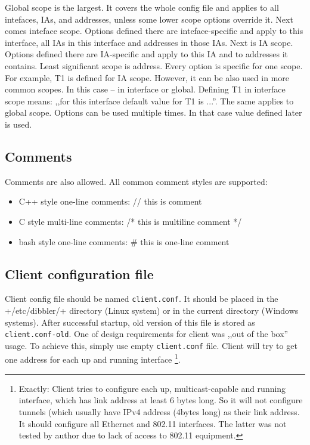Global scope is the largest. It covers the whole config file and
applies to all intefaces, IAs, and addresses, unless some lower scope
options override it. Next comes inteface scope. Options defined there
are inteface-specific and apply to this interface, all IAs in this
interface and addresses in those IAs. Next is IA scope. Options
defined there are IA-specific and apply to this IA and to addresses it
contains. Least significant scope is address. Every option is specific
for one scope. For example, T1 is defined for
IA scope. However, it can be also used in more common scopes. In this
case -- in interface or global. Defining T1 in interface scope means:
,,for this interface default value for T1 is ...''. The same applies
to global scope. Options can be used multiple times. In that case
value defined later is used.

\subsection{Comments}

Comments are also allowed. All common comment styles are supported:
\begin{itemize}
\item C++ style one-line comments: // this is comment
\item C style multi-line comments: /* this is multiline comment */
\item bash style one-line comments: \# this is one-line comment
\end{itemize}

\subsection{Client configuration file}

Client config file should be named \verb+client.conf+. It should be
placed in the +/etc/dibbler/+ directory (Linux system) or in the
current directory (Windows systems). After successful startup, old
version of this file is stored as \verb+client.conf-old+. One of
design requirements for client was ,,out of the box'' usage. To
achieve this, simply use empty 
\verb+client.conf+ file. Client will try to get one address for each up and
running interface \footnote{Exactly: Client tries to configure each
  up, multicast-capable and running interface, which has link address
  at least 6 bytes long. So it will not configure tunnels (which
  usually have IPv4 address (4bytes long) as their link address. It
  should configure all Ethernet and 802.11 interfaces. The latter was
  not tested by author due to lack of access to 802.11 equipment.}.

